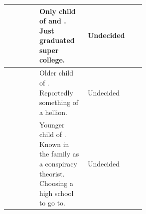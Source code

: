 \documentclass[blue]{LRSguildcamp1}
\begin{document}
\begin{tabular}{l|l|l|p{0.35\linewidth}|p{0.1\linewidth}|p{0.1\linewidth}}
\cGrad{\intro} & \cGrad{\they} & \cGrad{\MYsupername} & Only child of \cOldest{} and \cOS{}.  Just graduated super college. & Undecided & \cGrad{\MYsuperpower} \\ \hline
\cTeen{\intro} & \cTeen{\they} & \cTeen{\MYsupername} & Older child of \cArchitect{}.  Reportedly something of a hellion. & Undecided & \cTeen{\MYsuperpower} \\ \hline
\cTween{\intro} & \cTween{\they} & \cTween{\MYsupername} & Younger child of \cArchitect{}.  Known in the family as a conspiracy theorist.  Choosing a high school to go to. & Undecided & \cTween{\MYsuperpower} \\ \hline
\end{tabular}
\end{document}
